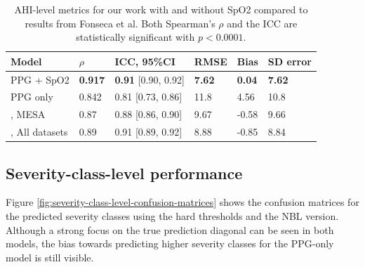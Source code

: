 \renewcommand{\arraystretch}{1.5}
\begin{table}
    \centering
    \begin{tabular}{ l p{1cm} p{2.5cm} p{1cm} p{1cm} p{1.5cm} }
        Model & $\rho$ & ICC, 95\%CI & RMSE & Bias & SD error \\
        \hline
        PPG + SpO2 & \textbf{0.917} & \textbf{0.91} [0.90, 0.92] & \textbf{7.62} & \textbf{0.04} & \textbf{7.62} \\
        PPG only   & 0.842 & 0.81 [0.73, 0.86] & 11.8 & 4.56 & 10.8 \\
        \hline
        \cite{fonseca2024estimating}, MESA & 0.87 & 0.88 [0.86, 0.90] & 9.67 & -0.58 & 9.66 \\
        \cite{fonseca2024estimating}, All datasets & 0.89 & 0.91 [0.89, 0.92] & 8.88 & -0.85 & 8.84 \\
    \end{tabular}
    \caption{AHI-level metrics for our work with and without SpO2 compared to results from Fonseca et al. Both Spearman's $\rho$ and the ICC are statistically significant with $p < 0.0001$. \label{tab:ahi-level-metrics}}
\end{table}

\subsection*{Severity-class-level performance}

Figure \ref{fig:severity-class-level-confusion-matrices} shows the confusion matrices for the predicted severity classes using the hard thresholds and the NBL version. Although a strong focus on the true prediction diagonal can be seen in both models, the bias towards predicting higher severity classes for the PPG-only model is still visible.

